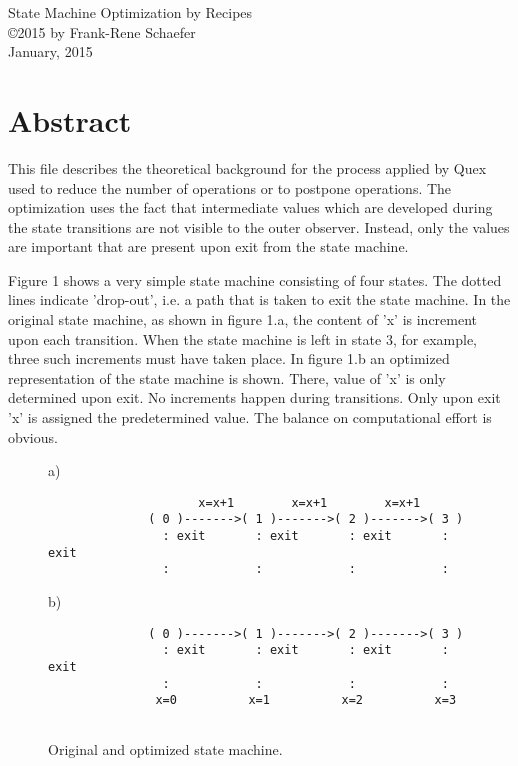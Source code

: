 \documentclass[12pt]{article}
\begin{document}
\begin{center}
{\large State Machine Optimization by Recipes} \\ 
\copyright 2015 by Frank-Rene Schaefer         \\
January, 2015
\end{center}

\section{Abstract}

This file describes the theoretical background for the process applied by Quex
used to reduce the number of operations or to postpone operations.  The
optimization uses the fact that intermediate values which are developed during
the state transitions are not visible to the outer observer. Instead, only the
values are important that are present upon exit from the state machine.

Figure 1 shows a very simple state machine consisting of four states.  The
dotted lines indicate 'drop-out', i.e. a path that is taken to exit the state
machine.  In the original state machine, as shown in figure 1.a, the content of
'x' is increment upon each transition. When the state machine is left in state
3, for example, three such increments must have taken place. In figure 1.b an
optimized representation of the state machine is shown.  There, value of 'x' is
only determined upon exit.  No increments happen during transitions. Only upon
exit 'x' is assigned the predetermined value. The balance on computational
effort is obvious.

\begin{figure}[htbp] \leavevmode
a)
\begin{verbatim}
                     x=x+1        x=x+1        x=x+1
              ( 0 )------->( 1 )------->( 2 )------->( 3 )
                : exit       : exit       : exit       : exit
                :            :            :            :
\end{verbatim}
    
b)
\begin{verbatim}
              ( 0 )------->( 1 )------->( 2 )------->( 3 )
                : exit       : exit       : exit       : exit
                :            :            :            :
               x=0          x=1          x=2          x=3
    
\end{verbatim}
\caption{Original and optimized state machine.}
\end{figure}
                 
\end{document}
